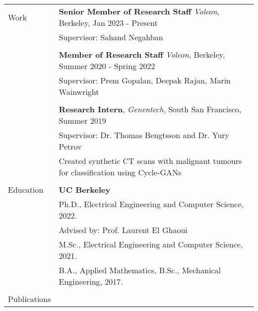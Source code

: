 \documentclass[letterpaper,10pt,oneside]{article}
\begin{document}
\noindent \begin{tabular}{@{} l l}
    \Large{Work}   & \textbf{Senior Member of Research Staff} \textit{Voleon}, Berkeley, Jan 2023 - Present\\
    & Supervisor: Sahand Negahban \\
    &\\   
    & \textbf{Member of Research Staff} \textit{Voleon}, Berkeley, Summer 2020 - Spring 2022\\
    & Supervisor: Prem Gopalan, Deepak Rajan, Marin Wainwright \\
    &\\   
    & \textbf{Research Intern}, \textit{Genentech}, South San Francisco, Summer 2019\\
    & Supervisor: Dr. Thomas Bengtsson and Dr. Yury Petrov \\
    & Created synthetic CT scans with malignant tumours for classification using Cycle-GANs\\
    &\\
 \Large{Education}    & \textbf{UC Berkeley} \\
     & Ph.D., Electrical Engineering and Computer Science, 2022. \\
     & \indent \small{Advised by: Prof. Laurent El Ghaoui}\\
     & M.Sc., Electrical Engineering and Computer Science, 2021. \\
     & B.A., Applied Mathematics, B.Sc., Mechanical Engineering, 2017. \\
     & \\
     \Large{Publications}  

\end{tabular}
\end{document}
